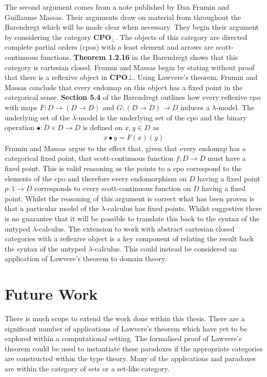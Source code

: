The second argument comes from a note published by Dan Frumin and Guillaume
Massas. Their arguments draw on material from throughout the Barendregt
\cite{barendregt1992lambda} which will be made clear when necessary. They begin
their argument by considering the category \textbf{CPO}$_{\bot}$. The objects of
this category are directed complete partial orders (cpos) with a least element
and arrows are scott-continuous functions. \textbf{Theorem 1.2.16} in the
Barendregt shows that this category is cartesian closed. Frumin and Massas begin
by stating without proof that there is a reflexive object in \textbf{CPO}$\bot$.
Using Lawvere's theorem, Frumin and Massas conclude that every endomap on this
object has a fixed point in the categorical sense. \textbf{Section 5.4} of the
Barendregt outlines how every reflexive cpo with maps $F : D \rightarrow (D
\rightarrow D)$ and $G : (D \rightarrow D) \rightarrow D$ induces a
$\lambda$-model. The underlying set of the $\lambda$-model is the underlying set
of the cpo and the binary operation $\bullet : D \times D \rightarrow D$ is
defined on $x , y \in D$ as \begin{align*} x \bullet y = F(x)(y) \end{align*}
Frumin and Massas argue to the effect that, given that every endomap has a
categorical fixed point, that scott-continuous function $f : D \rightarrow D$
must have a fixed point. This is valid reasoning as the points to a cpo
correspond to the elements of the cpo and therefore every endomorphism on $D$
having a fixed point $p : 1 \rightarrow D$ corresponds to every scott-continuous
function on $D$ having a fixed point. Whilst the reasoning of this argument is
correct what has been proven is that a particular model of the
$\lambda$-calculus has fixed points. Whilst suggestive there is no guarantee
that it will be possible to translate this back to the syntax of the untyped
$\lambda$-calculus. The extension to work with abstract cartesian closed
categories with a reflexive object is a key component of relating the result
back the syntax of the untyped $\lambda$-calculus. This could instead be
considered an application of Lawvere's theorem to domain theory.

\section{Future Work}
There is much scope to extend the work done within this thesis. There are a
significant number of applications of Lawvere's theorem which have yet to be
explored within a computational setting. The formalised proof of Lawvere's
theorem could be used to instantiate these paradoxes if the appropriate
categories are constructed within the type theory. Many of the applications and
paradoxes are within the category of sets or a set-like category.

